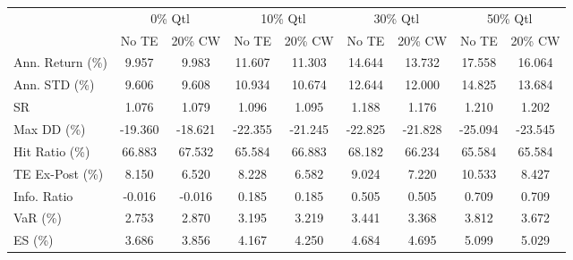 \begin{tabular}{lcccccccc}
\toprule
{} & \multicolumn{2}{c}{0\% Qtl} & \multicolumn{2}{c}{10\% Qtl} & \multicolumn{2}{c}{30\% Qtl} & \multicolumn{2}{c}{50\% Qtl} \\
{} &   No TE &  20\% CW &   No TE &  20\% CW &   No TE &  20\% CW &   No TE &  20\% CW \\
\midrule
Ann. Return (\%) &   9.957 &   9.983 &  11.607 &  11.303 &  14.644 &  13.732 &  17.558 &  16.064 \\
Ann. STD (\%)    &   9.606 &   9.608 &  10.934 &  10.674 &  12.644 &  12.000 &  14.825 &  13.684 \\
SR              &   1.076 &   1.079 &   1.096 &   1.095 &   1.188 &   1.176 &   1.210 &   1.202 \\
Max DD (\%)      & -19.360 & -18.621 & -22.355 & -21.245 & -22.825 & -21.828 & -25.094 & -23.545 \\
Hit Ratio (\%)   &  66.883 &  67.532 &  65.584 &  66.883 &  68.182 &  66.234 &  65.584 &  65.584 \\
TE Ex-Post (\%)  &   8.150 &   6.520 &   8.228 &   6.582 &   9.024 &   7.220 &  10.533 &   8.427 \\
Info. Ratio     &  -0.016 &  -0.016 &   0.185 &   0.185 &   0.505 &   0.505 &   0.709 &   0.709 \\
VaR (\%)         &   2.753 &   2.870 &   3.195 &   3.219 &   3.441 &   3.368 &   3.812 &   3.672 \\
ES (\%)          &   3.686 &   3.856 &   4.167 &   4.250 &   4.684 &   4.695 &   5.099 &   5.029 \\
\bottomrule
\end{tabular}
